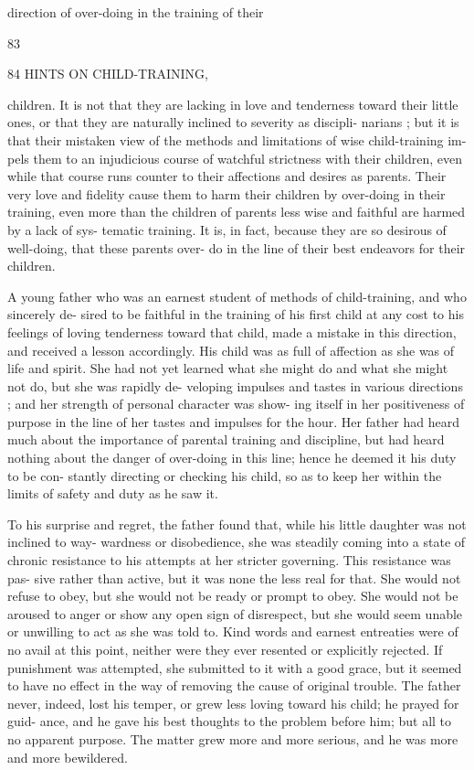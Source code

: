 \documentclass[
]{book}
\begin{document}
direction of over-doing in the training of their

83

84 HINTS ON CHILD-TRAINING,

children. It is not that they are lacking in love and tenderness toward their little ones, or that they are naturally inclined to severity as discipli- narians ; but it is that their mistaken view of the methods and limitations of wise child-training im- pels them to an injudicious course of watchful strictness with their children, even while that course runs counter to their affections and desires as parents. Their very love and fidelity cause them to harm their children by over-doing in their training, even more than the children of parents less wise and faithful are harmed by a lack of sys- tematic training. It is, in fact, because they are so desirous of well-doing, that these parents over- do in the line of their best endeavors for their children.

A young father who was an earnest student of methods of child-training, and who sincerely de- sired to be faithful in the training of his first child at any cost to his feelings of loving tenderness toward that child, made a mistake in this direction, and received a lesson accordingly. His child was as full of affection as she was of life and spirit. She had not yet learned what she might do and what she might not do, but she was rapidly de- veloping impulses and tastes in various directions ; and her strength of personal character was show- ing itself in her positiveness of purpose in the line of her tastes and impulses for the hour. Her father had heard much about the importance of parental training and discipline, but had heard nothing about the danger of over-doing in this line; hence he deemed it his duty to be con- stantly directing or checking his child, so as to keep her within the limits of safety and duty as he saw it.

To his surprise and regret, the father found that, while his little daughter was not inclined to way- wardness or disobedience, she was steadily coming into a state of chronic resistance to his attempts at her stricter governing. This resistance was pas- sive rather than active, but it was none the less real for that. She would not refuse to obey, but she would not be ready or prompt to obey. She would not be aroused to anger or show any open sign of disrespect, but she would seem unable or unwilling to act as she was told to. Kind words and earnest entreaties were of no avail at this point, neither were they ever resented or explicitly rejected. If punishment was attempted, she submitted to it with a good grace, but it seemed to have no effect in the way of removing the cause of original trouble. The father never, indeed, lost his temper, or grew less loving toward his child; he prayed for guid- ance, and he gave his best thoughts to the problem before him; but all to no apparent purpose. The matter grew more and more serious, and he was more and more bewildered.
\end{document}
